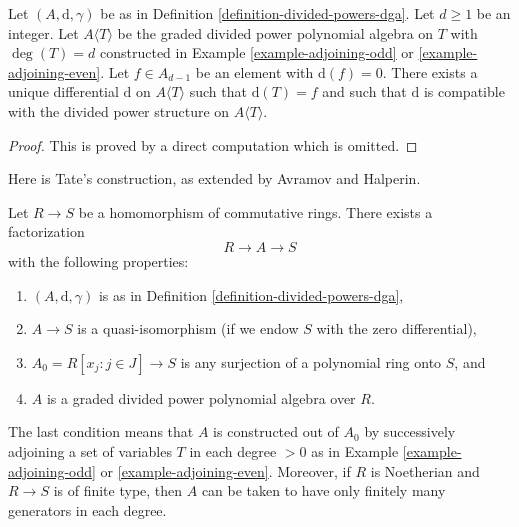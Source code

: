 \begin{lemma}
\label{lemma-extend-differential}
Let $(A, \text{d}, \gamma)$ be as in
Definition \ref{definition-divided-powers-dga}.
Let $d \geq 1$ be an integer.
Let $A\langle T \rangle$ be the graded divided power polynomial algebra
on $T$ with $\deg(T) = d$
constructed in Example \ref{example-adjoining-odd} or
\ref{example-adjoining-even}.
Let $f \in A_{d - 1}$ be an element with $\text{d}(f) = 0$.
There exists a unique differential $\text{d}$
on $A\langle T\rangle$ such that $\text{d}(T) = f$ and
such that $\text{d}$ is compatible with the divided power
structure on $A\langle T \rangle$.
\end{lemma}

\begin{proof}
This is proved by a direct computation which is omitted.
\end{proof}

\noindent
Here is Tate's construction, as extended
by Avramov and Halperin.

\begin{lemma}
\label{lemma-tate-resolution}
Let $R \to S$ be a homomorphism of commutative rings.
There exists a factorization
$$
R \to A \to S
$$
with the following properties:
\begin{enumerate}
\item $(A, \text{d}, \gamma)$ is as in
Definition \ref{definition-divided-powers-dga},
\item $A \to S$ is a quasi-isomorphism (if we endow $S$ with
the zero differential),
\item $A_0 = R[x_j: j\in J] \to S$ is any surjection of a polynomial
ring onto $S$, and
\item $A$ is a graded divided power polynomial algebra over $R$.
\end{enumerate}
The last condition means that $A$ is constructed out of $A_0$ by
successively adjoining a set of variables $T$ in each degree $> 0$ as in
Example \ref{example-adjoining-odd} or \ref{example-adjoining-even}.
Moreover, if $R$ is Noetherian and $R\to S$ is of finite type,
then $A$ can be taken to have only finitely many generators in
each degree.
\end{lemma}

